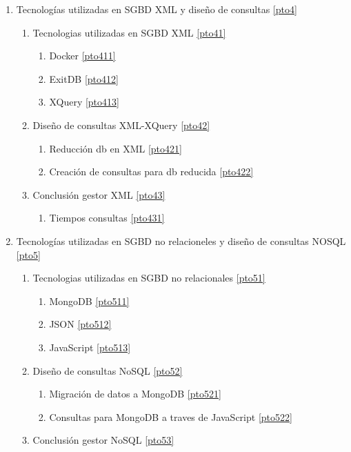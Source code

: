 \documentclass[12pt,a4paper]{article}
\begin{document}
\begin{enumerate}
	 
\item Tecnologías utilizadas en SGBD XML y diseño de consultas \ref{pto4}
	\begin{enumerate}[label*=\arabic*.]
	\item Tecnologias utilizadas en SGBD XML \ref{pto41}
		\begin{enumerate}[label*=\arabic*.]
		\item Docker \ref{pto411}
		\item ExitDB \ref{pto412}
		\item XQuery \ref{pto413}
		\end{enumerate}
	
	\item Diseño de consultas XML-XQuery \ref{pto42}
		\begin{enumerate}[label*=\arabic*.]
		\item Reducción db en XML \ref{pto421}
		\item Creación de consultas para db reducida \ref{pto422}
		\end{enumerate}

	\item Conclusión gestor XML \ref{pto43}
		\begin{enumerate}[label*=\arabic*.]
		\item Tiempos consultas \ref{pto431}
		\end{enumerate}
	\end{enumerate}
	
\item  Tecnologías utilizadas en SGBD no relacioneles y diseño de consultas NOSQL \ref{pto5}
	\begin{enumerate}[label*=\arabic*.]
	\item Tecnologias utilizadas en SGBD no relacionales \ref{pto51}
		\begin{enumerate}[label*=\arabic*.]
		\item MongoDB \ref{pto511}
		\item JSON \ref{pto512}
		\item JavaScript \ref{pto513}
		\end{enumerate}
	\item Diseño de consultas NoSQL \ref{pto52}
		\begin{enumerate}[label*=\arabic*.]
		\item Migración de datos a MongoDB \ref{pto521}
		\item Consultas para MongoDB a traves de JavaScript \ref{pto522}
		\end{enumerate}
	\item Conclusión gestor NoSQL \ref{pto53}
	\end{enumerate}



\end{enumerate}
\end{document}
